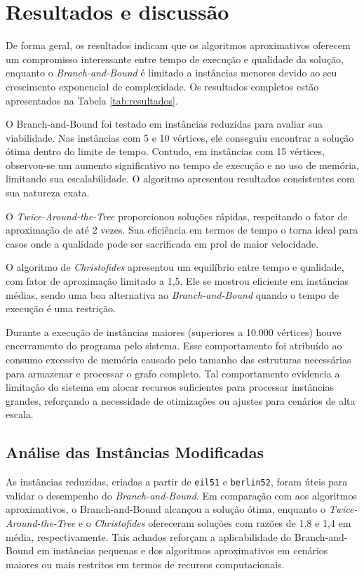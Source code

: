 \documentclass[12pt]{article}
\begin{document}
\section{Resultados e discussão}

De forma geral, os resultados indicam que os algoritmos aproximativos oferecem um compromisso interessante entre tempo de execução e qualidade da solução, enquanto o \textit{Branch-and-Bound} é limitado a instâncias menores devido ao seu crescimento exponencial de complexidade. Os resultados completos estão apresentados na Tabela \ref{tab:resultados}.

O Branch-and-Bound foi testado em instâncias reduzidas para avaliar sua viabilidade. Nas instâncias com 5 e 10 vértices, ele conseguiu encontrar a solução ótima dentro do limite de tempo. Contudo, em instâncias com 15 vértices, observou-se um aumento significativo no tempo de execução e no uso de memória, limitando sua escalabilidade. O algoritmo apresentou resultados consistentes com sua natureza exata.

O \textit{Twice-Around-the-Tree} proporcionou soluções rápidas, respeitando o fator de aproximação de até 2 vezes. Sua eficiência em termos de tempo o torna ideal para casos onde a qualidade pode ser sacrificada em prol de maior velocidade.

O algoritmo de \textit{Christofides} apresentou um equilíbrio entre tempo e qualidade, com fator de aproximação limitado a 1,5. Ele se mostrou eficiente em instâncias médias, sendo uma boa alternativa ao \textit{Branch-and-Bound} quando o tempo de execução é uma restrição.

Durante a execução de instâncias maiores (superiores a 10.000 vértices) houve encerramento do programa pelo sistema. Esse comportamento foi atribuído ao consumo excessivo de memória causado pelo tamanho das estruturas necessárias para armazenar e processar o grafo completo. Tal comportamento evidencia a limitação do sistema em alocar recursos suficientes para processar instâncias grandes, reforçando a necessidade de otimizações ou ajustes para cenários de alta escala.

\subsection{Análise das Instâncias Modificadas}
As instâncias reduzidas, criadas a partir de \texttt{eil51} e \texttt{berlin52}, foram úteis para validar o desempenho do \textit{Branch-and-Bound}. Em comparação com aos algoritmos aproximativos, o Branch-and-Bound alcançou a solução ótima, enquanto o \textit{Twice-Around-the-Tree} e o \textit{Christofides} ofereceram soluções com razões de 1,8 e 1,4 em média, respectivamente. Tais achados reforçam a aplicabilidade do Branch-and-Bound em instâncias pequenas e dos algoritmos aproximativos em cenários maiores ou mais restritos em termos de recursos computacionais.
\end{document}
